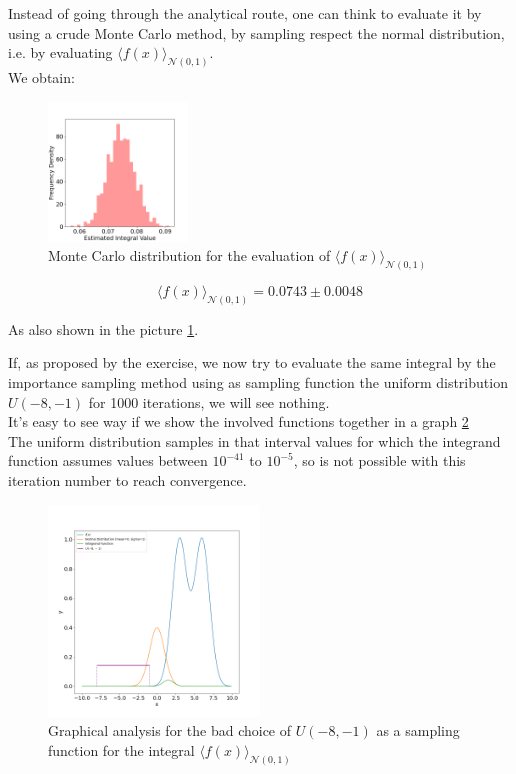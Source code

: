 Instead of going through the analytical route, one can think to evaluate it by using a crude Monte Carlo method, by sampling respect the normal distribution, 
i.e. by evaluating $\langle f(x) \rangle_{\mathcal{N}(0,1)}$. \\
We obtain:
\begin{figure}
  \centering
  \includegraphics[width=0.33\textwidth]{FIG/exercise_3_images/distribution_crude_mc_ex2.png}
\caption{Monte Carlo distribution for the evaluation of $\langle f(x) \rangle_{\mathcal{N}(0,1)}$}
\label{crude_mc_integral2}
\end{figure}
$$ \langle f(x) \rangle_{\mathcal{N}(0,1)} = 0.0743 \pm 0.0048 $$

As also shown in the picture \ref{crude_mc_integral2}.



If, as proposed by the exercise, we now try to evaluate the same integral by the importance sampling 
method using as sampling function the uniform distribution $U(-8, -1)$ for 1000 iterations, we will see nothing. \\
It's easy to see way if we show the involved functions together in a graph \ref{badchoice} \\
The uniform distribution samples in that interval values for which the integrand function assumes values between $10^{-41}$ to $10^{-5}$, 
so is not possible with this iteration number to reach convergence.  

\begin{figure}[H]
  \centering
  \includegraphics[width=0.5\textwidth]{FIG/exercise_3_images/distribution_consideration.png}
  \caption{Graphical analysis for the bad choice of $U(-8,-1)$ as a sampling function for the integral $\langle f(x) \rangle_{\mathcal{N}(0,1)}$}
  \label{badchoice}
  \end{figure}

